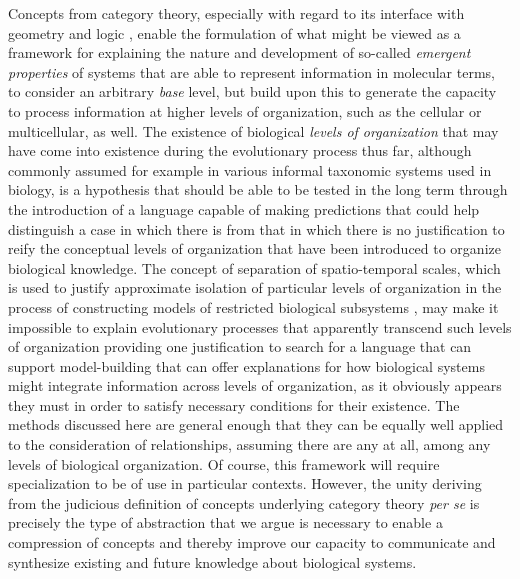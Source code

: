 \documentclass[aps,twocolumn]{revtex4-1}
\begin{document}
Concepts from category theory, especially with regard to its interface with geometry and logic \cite{MacLane1992,Jacobs1998}, enable the formulation of what might be viewed as a framework for explaining the nature and development of so-called \emph{emergent properties} of systems that are able to represent information in molecular terms, to consider an arbitrary {\it base} level, but build upon this to generate the capacity to process information at higher levels of organization, such as the cellular or multicellular, as well. The existence of biological {\it levels of organization} that may have come into existence during the evolutionary process thus far, although commonly assumed for example in various informal taxonomic systems used in biology, is a hypothesis that should be able to be tested in the long term through the introduction of a language capable of making predictions that could help distinguish a case in which there is from that in which there is no justification to reify the conceptual levels of organization that have been introduced to organize biological knowledge. The concept of separation of spatio-temporal scales, which is used to justify approximate isolation of particular levels of organization in the process of constructing models of restricted biological subsystems \cite{Gunawardena2012,Karr2012}, may make it impossible to explain evolutionary processes that apparently transcend such levels of organization providing one justification to search for a language that can support model-building that can offer explanations for how biological systems might integrate information across levels of organization, as it obviously appears they must in order to satisfy necessary conditions for their existence. The methods discussed here are general enough that they can be equally well applied to the consideration of relationships, assuming there are any at all, among any levels of biological organization. Of course, this framework will require specialization to be of use in particular contexts. However, the unity deriving from the judicious definition of concepts underlying category theory {\it per se} is precisely the type of abstraction that we argue is necessary to enable a compression of concepts and thereby improve our capacity to communicate and synthesize existing and future knowledge about biological systems.
\end{document}
